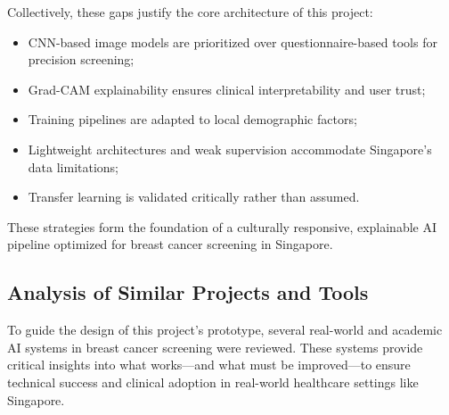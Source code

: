 \documentclass[12pt]{article}
\begin{document}
\vspace{0.5em}
Collectively, these gaps justify the core architecture of this project:
\begin{itemize}
    \item CNN-based image models are prioritized over questionnaire-based tools for precision screening;
    \item Grad-CAM explainability ensures clinical interpretability and user trust;
    \item Training pipelines are adapted to local demographic factors;
    \item Lightweight architectures and weak supervision accommodate Singapore's data limitations;
    \item Transfer learning is validated critically rather than assumed.
\end{itemize}

These strategies form the foundation of a culturally responsive, explainable AI pipeline optimized for breast cancer screening in Singapore.

\subsection{Analysis of Similar Projects and Tools}

To guide the design of this project’s prototype, several real-world and academic AI systems in breast cancer screening were reviewed. These systems provide critical insights into what works—and what must be improved—to ensure technical success and clinical adoption in real-world healthcare settings like Singapore.
\end{document}
